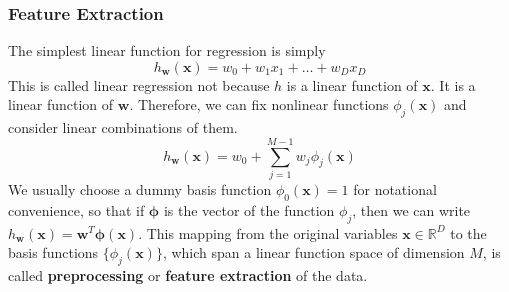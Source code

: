 \documentclass{article}
\theoremstyle{definition}
\begin{document}
    \subsubsection{Feature Extraction}

    The simplest linear function for regression is simply 
    \[h_\mathbf{w} (\mathbf{x}) = w_0 + w_1 x_1 + \ldots + w_D x_D\]
    This is called linear regression not because $h$ is a linear function of $\mathbf{x}$. It is a linear function of $\mathbf{w}$. Therefore, we can fix nonlinear functions $\phi_j (\mathbf{x})$ and consider linear combinations of them. 
    \[h_\mathbf{w} (\mathbf{x}) = w_0 + \sum_{j=1}^{M-1} w_j \phi_j (\mathbf{x})\]
    We usually choose a dummy basis function $\phi_0 (\mathbf{x}) = 1$ for notational convenience, so that if $\boldsymbol{\phi}$ is the vector of the function $\phi_j$, then we can write $h_\mathbf{w} (\mathbf{x}) = \mathbf{w}^T \boldsymbol{\phi} (\mathbf{x})$. This mapping from the original variables $\mathbf{x} \in \mathbb{R}^D$ to the basis functions $\{\phi_j (\mathbf{x})\}$, which span a linear function space of dimension $M$, is called \textbf{preprocessing} or \textbf{feature extraction} of the data. 
\end{document}
